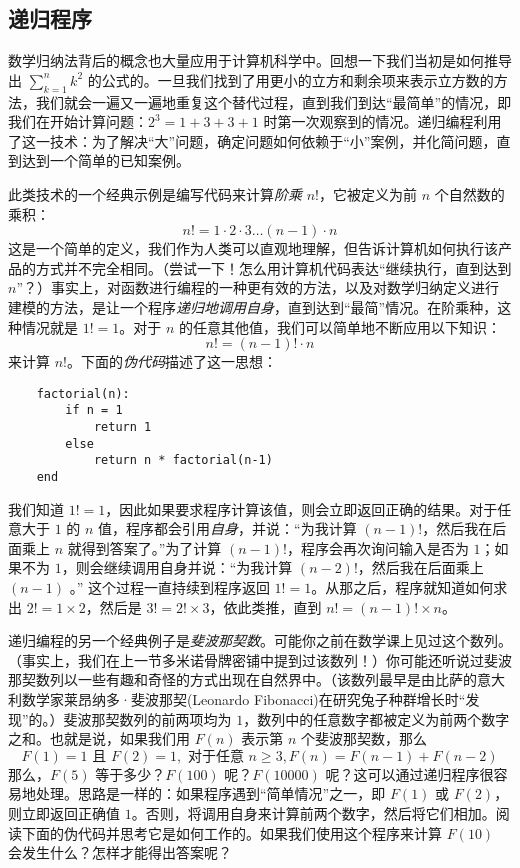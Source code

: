 \subsection{递归程序}\label{sec:section2.5.1}

数学归纳法背后的概念也大量应用于计算机科学中。回想一下我们当初是如何推导出 $\sum_{k=1}^{n}k^2$ 的公式的。一旦我们找到了用更小的立方和剩余项来表示立方数的方法，我们就会一遍又一遍地重复这个替代过程，直到我们到达``最简单''的情况，即我们在开始计算问题：$2^3=1+3+3+1$ 时第一次观察到的情况。递归编程利用了这一技术：为了解决``大''问题，确定问题如何依赖于``小''案例，并化简问题，直到达到一个简单的已知案例。

此类技术的一个经典示例是编写代码来计算\emph{阶乘} $n!$，它被定义为前 $n$ 个自然数的乘积：
\[n! = 1 \cdot 2 \cdot 3 \dots (n - 1) \cdot n\]
这是一个简单的定义，我们作为人类可以直观地理解，但告诉计算机如何执行该产品的方式并不完全相同。（尝试一下！怎么用计算机代码表达``继续执行，直到达到 $n$''？）事实上，对函数进行编程的一种更有效的方法，以及对数学归纳定义进行建模的方法，是让一个程序\emph{递归地调用自身}，直到达到``最简''情况。在阶乘种，这种情况就是 $1! = 1$。对于 $n$ 的任意其他值，我们可以简单地不断应用以下知识：
\[n! = (n - 1)! \cdot n\]
来计算 $n!$。下面的\emph{伪代码}描述了这一思想：

\begin{verbatim}
    factorial(n):
        if n = 1
            return 1
        else
            return n * factorial(n-1)
    end
\end{verbatim}

我们知道 $1! = 1$，因此如果要求程序计算该值，则会立即返回正确的结果。对于任意大于 $1$ 的 $n$ 值，程序都会引用\emph{自身}，并说：``为我计算 $(n-1)!$，然后我在后面乘上 $n$ 就得到答案了。''为了计算 $(n-1)!$，程序会再次询问输入是否为 $1$；如果不为 $1$，则会继续调用自身并说：``为我计算 $(n-2)!$，然后我在后面乘上 $(n-1)$ 。'' 这个过程一直持续到程序返回 $1! = 1$。从那之后，程序就知道如何求出 $2! = 1 \times 2$，然后是 $3! = 2! \times 3$，依此类推，直到 $n! = (n - 1)! \times n$。

递归编程的另一个经典例子是\emph{斐波那契数}。可能你之前在数学课上见过这个数列。（事实上，我们在上一节多米诺骨牌密铺中提到过该数列！）你可能还听说过斐波那契数列以一些有趣和奇怪的方式出现在自然界中。（该数列最早是由比萨的意大利数学家莱昂纳多·斐波那契(Leonardo Fibonacci)在研究兔子种群增长时``发现''的。）斐波那契数列的前两项均为 $1$，数列中的任意数字都被定义为前两个数字之和。也就是说，如果我们用 $F(n)$ 表示第 $n$ 个斐波那契数，那么
\[F(1) = 1 \text{ 且 }F(2) = 1, \text{ 对于任意 } n \ge 3, F(n) = F(n - 1) + F(n - 2)\]
那么，$F(5)$ 等于多少？$F(100)$ 呢？$F(10000)$ 呢？这可以通过递归程序很容易地处理。思路是一样的：如果程序遇到``简单情况''之一，即 $F(1)$ 或 $F(2)$，则立即返回正确值 $1$。否则，将调用自身来计算前两个数字，然后将它们相加。阅读下面的伪代码并思考它是如何工作的。如果我们使用这个程序来计算 $F(10)$ 会发生什么？怎样才能得出答案呢？

